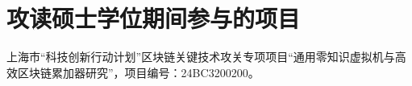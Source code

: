 \chapter{攻读硕士学位期间参与的项目}

\begin{enumerate}[label={[\arabic*]}]
    \item 上海市“科技创新行动计划”区块链关键技术攻关专项项目“通用零知识虚拟机与高效区块链累加器研究”，项目编号：24BC3200200。
\end{enumerate}
